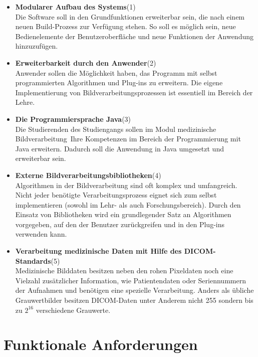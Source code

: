 \begin{itemize}
\item  \textbf{Modularer Aufbau des Systems}(1)\\
	  Die Software soll in den Grundfunktionen erweiterbar sein, die nach einem neuen Build-Prozess zur Verfügung stehen. So soll es möglich sein, neue Bedienelemente der Benutzeroberfläche und neue Funktionen der Anwendung hinzuzufügen.
	  
\item \textbf{Erweiterbarkeit durch den Anwender}(2)\\
	Anwender sollen die Möglichkeit haben, das Programm mit selbst programmierten Algorithmen und Plug-ins zu erweitern. Die eigene Implementierung von Bildverarbeitungsprozessen ist essentiell im Bereich der Lehre.
	
\item \textbf{Die Programmiersprache Java}(3)\\
	Die Studierenden des Studiengangs sollen im Modul \glqq medizinische Bildverarbeitung\grqq\ Ihre Kompetenzen im Bereich der Programmierung mit Java erweitern. Dadurch soll die Anwendung in Java umgesetzt und erweiterbar sein.
	
\item \textbf{Externe Bildverarbeitungsbibliotheken}(4)\\
	Algorithmen in der Bildverarbeitung sind oft komplex und umfangreich. Nicht jeder benötigte Verarbeitungsprozess eignet sich zum selbst implementieren (sowohl im Lehr- als auch Forschungsbereich). Durch den Einsatz von Bibliotheken wird ein grundlegender Satz an Algorithmen vorgegeben, auf den der Benutzer zurückgreifen und in den Plug-ins verwenden kann.
	
\item \textbf{Verarbeitung medizinische Daten mit Hilfe des DICOM-Standards}(5)\\
	Medizinische Bilddaten besitzen neben den rohen Pixeldaten noch eine Vielzahl zusätzlicher Information, wie Patientendaten oder Seriennummern der Aufnahmen und benötigen eine spezielle Verarbeitung. Anders als übliche Grauwertbilder besitzen DICOM-Daten unter Anderem nicht 255 sondern bis zu $2^{16}$ verschiedene Grauwerte.
\end{itemize}

\section{Funktionale Anforderungen}

